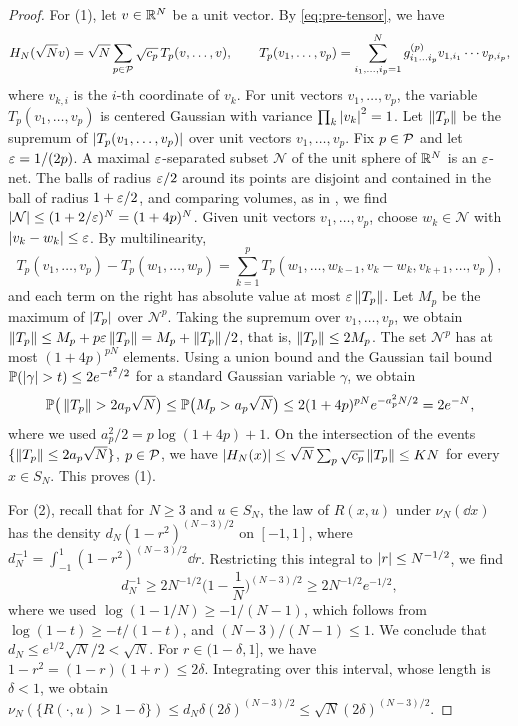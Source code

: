 \begin{proof}
For (1), let $v\in\mathbb R^N$ be a unit vector. By \eqref{eq:pre-tensor}, we have
\[
H_N(\sqrt N v)=\sqrt N\sum_{p\in\mathcal P}\sqrt{c_p}\,T_p(v,\dots,v),\qquad T_p(v_1,\dots,v_p)=\sum_{i_1,\dots,i_p=1}^Ng^{(p)}_{i_1\dots i_p}v_{1,i_1}\cdots v_{p,i_p},
\]
where $v_{k,i}$ is the $i$-th coordinate of $v_k$. For unit vectors $v_1,\dots,v_p$, the variable $T_p(v_1,\dots,v_p)$ is centered Gaussian with variance $\prod_k\left|v_k\right|^2=1$. Let $\left\lVert T_p\right\rVert$ be the supremum of $\left|T_p(v_1,\dots,v_p)\right|$ over unit vectors $v_1,\dots,v_p$. Fix $p\in\mathcal P$ and let $\varepsilon=1/(2p)$. A maximal $\varepsilon$-separated subset $\mathcal N$ of the unit sphere of $\mathbb R^N$ is an $\varepsilon$-net. The balls of radius $\varepsilon/2$ around its points are disjoint and contained in the ball of radius $1+\varepsilon/2$, and comparing volumes, as in \cite[Appendix~A.8, Proposition~A.8.1]{Talagrand2011Volume1}, we find $\left|\mathcal N\right|\le(1+2/\varepsilon)^N=(1+4p)^N$. Given unit vectors $v_1,\dots,v_p$, choose $w_k\in\mathcal N$ with $\left|v_k-w_k\right|\le\varepsilon$. By multilinearity,
\[
T_p(v_1,\dots,v_p)-T_p(w_1,\dots,w_p)=\sum_{k=1}^pT_p(w_1,\dots,w_{k-1},v_k-w_k,v_{k+1},\dots,v_p),
\]
and each term on the right has absolute value at most $\varepsilon\left\lVert T_p\right\rVert$. Let $M_p$ be the maximum of $\left|T_p\right|$ over $\mathcal N^p$. Taking the supremum over $v_1,\dots,v_p$, we obtain $\left\lVert T_p\right\rVert\le M_p+p\varepsilon\left\lVert T_p\right\rVert=M_p+\left\lVert T_p\right\rVert/2$, that is, $\left\lVert T_p\right\rVert\le2M_p$. The set $\mathcal N^p$ has at most $(1+4p)^{pN}$ elements. Using a union bound and the Gaussian tail bound $\Pp(\abs\gamma>t)\le2e^{-t^2/2}$ for a standard Gaussian variable $\gamma$, we obtain
\[
\mathbb P\big(\left\lVert T_p\right\rVert>2a_p\sqrt N\big)\le\mathbb P\big(M_p>a_p\sqrt N\big)\le2(1+4p)^{pN}e^{-a_p^2N/2}=2e^{-N},
\]
where we used $a_p^2/2=p\log(1+4p)+1$. On the intersection of the events $\{\left\lVert T_p\right\rVert\le2a_p\sqrt N\}$, $p\in\mathcal P$, we have $\left|H_N(x)\right|\le\sqrt N\sum_p\sqrt{c_p}\left\lVert T_p\right\rVert\le KN$ for every $x\in S_N$. This proves (1).

For (2), recall that for $N\ge3$ and $u\in S_N$, the law of $R(x,u)$ under $\nu_N(\dd x)$ has the density $d_N(1-r^2)^{(N-3)/2}$ on $[-1,1]$, where $d_N^{-1}=\int_{-1}^1(1-r^2)^{(N-3)/2}\dd r$. Restricting this integral to $\left|r\right|\le N^{-1/2}$, we find
\[
d_N^{-1}\ge2N^{-1/2}\Big(1-\frac1N\Big)^{(N-3)/2}\ge2N^{-1/2}e^{-1/2},
\]
where we used $\log(1-1/N)\ge-1/(N-1)$, which follows from $\log(1-t)\ge-t/(1-t)$, and $(N-3)/(N-1)\le1$. We conclude that $d_N\le e^{1/2}\sqrt N/2<\sqrt N$. For $r\in(1-\delta,1]$, we have $1-r^2=(1-r)(1+r)\le2\delta$. Integrating over this interval, whose length is $\delta<1$, we obtain $\nu_N(\{R(\cdot,u)>1-\delta\})\le d_N\delta(2\delta)^{(N-3)/2}\le\sqrt N(2\delta)^{(N-3)/2}$.


\end{proof}
